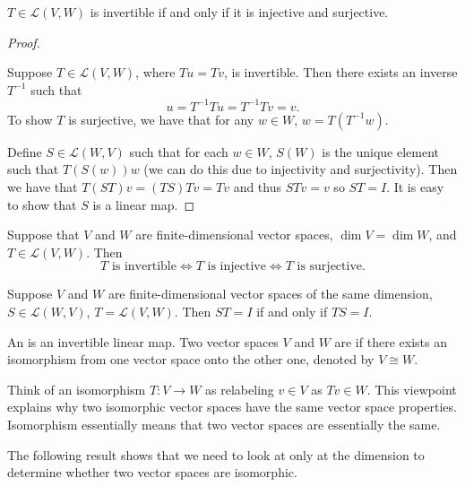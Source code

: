 \begin{proposition}
$T\in\mathcal{L}(V,W)$ is invertible if and only if it is injective and surjective.
\end{proposition}

\begin{proof} \

\fbox{$\implies$} Suppose $T\in\mathcal{L}(V,W)$, where $Tu=Tv$, is invertible. Then there exists an inverse $T^{-1}$ such that
\[u=T^{-1}Tu=T^{-1}Tv=v.\]
To show $T$ is surjective, we have that for any $w\in W$, $w=T(T^{-1}w)$.

\fbox{$\impliedby$} Define $S\in\mathcal{L}(W,V)$ such that for each $w\in W$, $S(W)$ is the unique element such that $T(S(w))w$ (we can do this due to injectivity and surjectivity). Then we have that $T(ST)v=(TS)Tv=Tv$ and thus $STv=v$ so $ST=I$. It is easy to show that $S$ is a linear map.
\end{proof}

\begin{proposition}
Suppose that $V$ and $W$ are finite-dimensional vector spaces, $\dim V=\dim W$, and $T\in\mathcal{L}(V,W)$. Then
\[T\text{ is invertible}\iff T\text{ is injective}\iff T\text{ is surjective}.\]
\end{proposition}

\begin{corollary}
Suppose $V$ and $W$ are finite-dimensional vector spaces of the same dimension, $S\in\mathcal{L}(W,V)$, $T=\mathcal{L}(V,W)$. Then $ST=I$ if and only if $TS=I$.
\end{corollary}

\begin{definition}[Isomorphism]
An  is an invertible linear map. Two vector spaces $V$ and $W$ are  if there exists an isomorphism from one vector space onto the other one, denoted by $V\cong W$.
\end{definition}

\begin{remark}
Think of an isomorphism $T:V\to W$ as relabeling $v\in V$ as $Tv\in W$. This viewpoint explains why two isomorphic vector spaces have the same vector space properties. Isomorphism essentially means that two vector spaces are essentially the same.
\end{remark}

The following result shows that we need to look at only at the dimension to determine whether two vector spaces are isomorphic.

